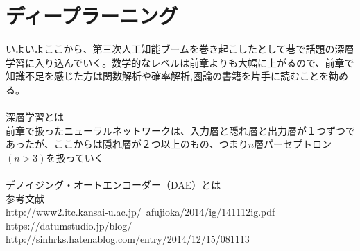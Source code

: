 \documentclass{jsarticle}
\begin{document}
\section{ディープラーニング}
いよいよここから、第三次人工知能ブームを巻き起こしたとして巷で話題の深層学習に入り込んでいく。数学的なレベルは前章よりも大幅に上がるので、前章で知識不足を感じた方は関数解析や確率解析,圏論の書籍を片手に読むことを勧める。\\
　\\
深層学習とは\\
前章で扱ったニューラルネットワークは、入力層と隠れ層と出力層が１つずつであったが、ここからは隠れ層が２つ以上のもの、つまり$n$層パーセプトロン$(n>3)$を扱っていく\\
　\\
デノイジング・オートエンコーダー（DAE）とは\\
















\newpage
参考文献\\
http://www2.itc.kansai-u.ac.jp/~afujioka/2014/ig/141112ig.pdf
https://datumstudio.jp/blog/\\
http://sinhrks.hatenablog.com/entry/2014/12/15/081113

　\\
　
\end{document}

